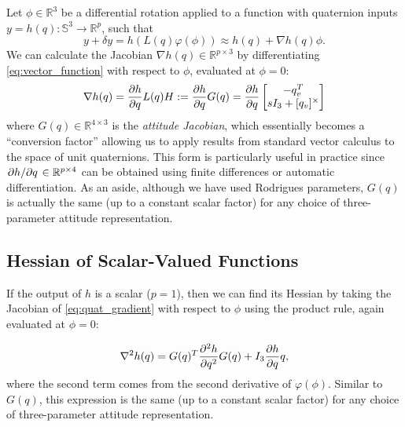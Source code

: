 \documentclass[letterpaper, 10 pt, conference]{ieeeconf}  %
\newcommand{\R}{\mathbb{R}}
\newcommand{\Q}{\mathbb{S}^3}
\newcommand{\skewmat}[1]{[#1]^\times}
\begin{document}
        Let $\phi \in \R^3$ be a differential rotation applied to a function with
        quaternion inputs $y = h(q): \Q \to \R^p$, such that
        \begin{equation} \label{eq:vector_function}
            y + \delta y = h(L(q) \varphi(\phi)) \approx h(q) +  \nabla h(q) \phi.
        \end{equation}
        We can calculate the Jacobian $\nabla h(q) \in \R^{p \times 3}$ by
        differentiating \eqref{eq:vector_function} with respect to $\phi$, evaluated at
        $\phi = 0$:
        \begin{equation} \label{eq:quat_gradient}
            \nabla h(q) = \pdv{h}{q} L(q) H := \pdv{h}{q} G(q) 
                        = \pdv{h}{q} \begin{bmatrix} 
                            -q_v^T \\ 
                            sI_3 + \skewmat{q_v}
                        \end{bmatrix}
        \end{equation}
        where $G(q) \in \R^{4 \times 3}$ is the \textit{attitude Jacobian}, which
        essentially becomes a ``conversion factor'' allowing us to apply results from
        standard vector calculus to the space of unit quaternions. This form is
        particularly useful in practice since $\pdv*{h}{q} \in \R^{p \times 4}$ can be
        obtained using finite differences or automatic differentiation.
        As an aside, although we have used Rodrigues parameters, $G(q)$ is actually the
        same (up to a constant scalar factor) for any choice of three-parameter attitude
        representation.

    \subsection{Hessian of Scalar-Valued Functions}
	    If the output of $h$ is a scalar ($p = 1$), then we can find its Hessian by
	    taking the Jacobian of \eqref{eq:quat_gradient} with respect to $\phi$ using the
        product rule, again evaluated at $\phi = 0$:

	    \begin{equation} \label{eq:quat_hessian}
            \nabla^2 h(q) = G(q)^T \pdv[2]{h}{q} G(q) + I_3 \pdv{h}{q}q,
	    \end{equation}
	    where the second term comes from the second derivative of $\varphi(\phi)$.
	    Similar to $G(q)$, this expression is the same (up to a constant scalar factor) for any
        choice of three-parameter attitude representation.
        
\end{document}
